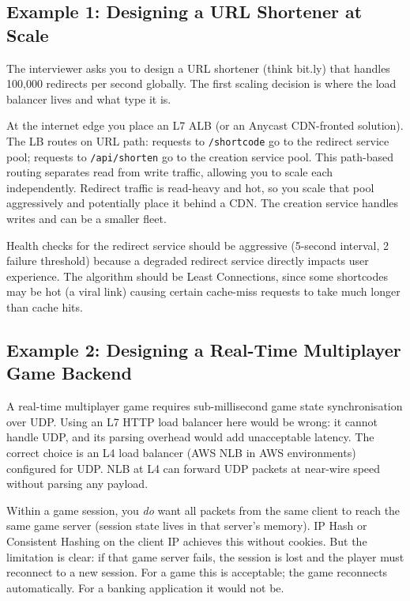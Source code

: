 \documentclass[11pt,a4paper]{article}
\begin{document}
\subsection{Example 1: Designing a URL Shortener at Scale}

The interviewer asks you to design a URL shortener (think bit.ly) that handles 100,000 redirects per
second globally. The first scaling decision is where the load balancer lives and what type it is.

At the internet edge you place an L7 ALB (or an Anycast CDN-fronted solution). The LB routes on
URL path: requests to \texttt{/{shortcode}} go to the redirect service pool; requests to
\texttt{/api/shorten} go to the creation service pool. This path-based routing separates read from
write traffic, allowing you to scale each independently. Redirect traffic is read-heavy and hot, so
you scale that pool aggressively and potentially place it behind a CDN. The creation service handles
writes and can be a smaller fleet.

Health checks for the redirect service should be aggressive (5-second interval, 2 failure threshold)
because a degraded redirect service directly impacts user experience. The algorithm should be Least
Connections, since some shortcodes may be hot (a viral link) causing certain cache-miss requests
to take much longer than cache hits.

\subsection{Example 2: Designing a Real-Time Multiplayer Game Backend}

A real-time multiplayer game requires sub-millisecond game state synchronisation over UDP. Using an
L7 HTTP load balancer here would be wrong: it cannot handle UDP, and its parsing overhead would
add unacceptable latency. The correct choice is an L4 load balancer (AWS NLB in AWS environments)
configured for UDP. NLB at L4 can forward UDP packets at near-wire speed without parsing any
payload.

Within a game session, you \emph{do} want all packets from the same client to reach the same game
server (session state lives in that server's memory). IP Hash or Consistent Hashing on the client
IP achieves this without cookies. But the limitation is clear: if that game server fails, the
session is lost and the player must reconnect to a new session. For a game this is acceptable;
the game reconnects automatically. For a banking application it would not be.
\end{document}
